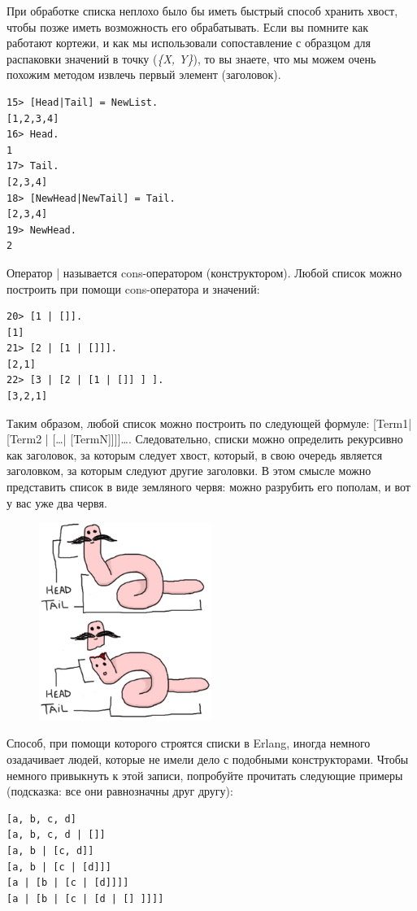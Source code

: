 \documentclass[a4paper,12pt]{report}
\newcommand{\ops}{\colorbox{lgreen}}
\begin{document}
При обработке списка неплохо было бы иметь быстрый способ хранить хвост, чтобы позже иметь возможность его обрабатывать. Если вы помните как работают кортежи, и как мы использовали сопоставление с образцом для распаковки значений в точку (\emph{\{X, Y\}}), то вы знаете, что мы можем очень похожим методом извлечь первый элемент (заголовок).
\begin{lstlisting}[style=repl]
15> [Head|Tail] = NewList.
[1,2,3,4]
16> Head.
1
17> Tail.
[2,3,4]
18> [NewHead|NewTail] = Tail.
[2,3,4]
19> NewHead.
2
\end{lstlisting}

Оператор \ops{|} называется cons\--оператором (конструктором). Любой список можно построить при помощи cons\--оператора и значений:
\begin{lstlisting}[style=repl]
20> [1 | []].
[1]
21> [2 | [1 | []]].
[2,1]
22> [3 | [2 | [1 | []] ] ].
[3,2,1]
\end{lstlisting}

Таким образом, любой список можно построить по следующей формуле: \ops{[Term1| [Term2 | [\ldots | [TermN]]]]\ldots}. Следовательно, списки можно определить рекурсивно как заголовок, за которым следует хвост, который, в свою очередь является заголовком, за которым следуют другие заголовки. В этом смысле можно представить список в виде земляного червя: можно разрубить его пополам, и вот у вас уже два червя.

\begin{figure}[h!]
    \includegraphics[width=0.5\textwidth]{worm.png}
\end{figure} 

Способ, при помощи которого строятся списки в Erlang, иногда немного озадачивает людей, которые не имели дело с подобными конструкторами. Чтобы немного привыкнуть к этой записи, попробуйте прочитать следующие примеры (подсказка: все они равнозначны друг другу):\\ 
\begin{lstlisting}[style=repl]
[a, b, c, d]
[a, b, c, d | []]
[a, b | [c, d]]
[a, b | [c | [d]]]
[a | [b | [c | [d]]]]
[a | [b | [c | [d | [] ]]]]
\end{lstlisting}
\end{document}
